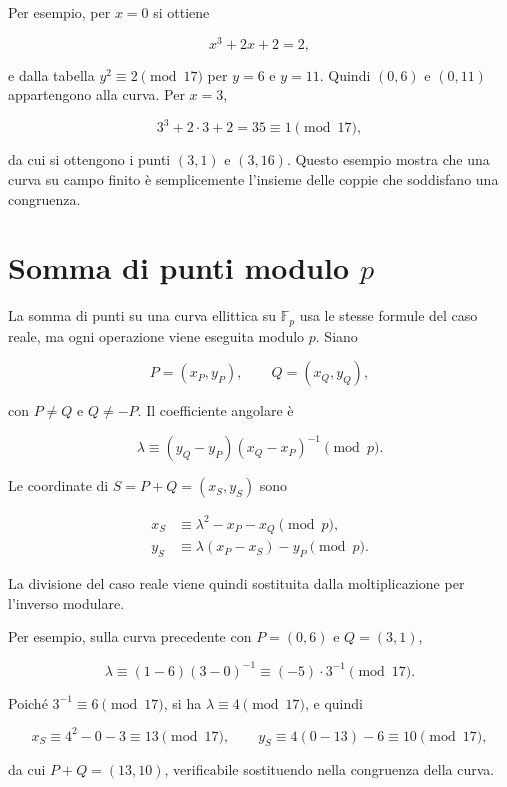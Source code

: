 \documentclass[12pt,a4paper,oneside]{report}
\begin{document}
Per esempio, per \(x=0\) si ottiene

\[
x^3+2x+2=2,
\]

e dalla tabella \(y^2\equiv 2\pmod{17}\) per \(y=6\) e \(y=11\). Quindi \((0,6)\) e \((0,11)\) appartengono alla curva. Per \(x=3\),

\[
3^3+2\cdot 3+2=35\equiv 1\pmod{17},
\]

da cui si ottengono i punti \((3,1)\) e \((3,16)\). Questo esempio mostra che una curva su campo finito è semplicemente l'insieme delle coppie che soddisfano una congruenza.

\section{Somma di punti modulo \texorpdfstring{\(p\)}{p}}

La somma di punti su una curva ellittica su \(\mathbb{F}_p\) usa le stesse formule del caso reale, ma ogni operazione viene eseguita modulo \(p\). Siano

\[
P=(x_P,y_P), \qquad Q=(x_Q,y_Q),
\]

con \(P\neq Q\) e \(Q\neq -P\). Il coefficiente angolare è

\begin{equation}
    \lambda \equiv (y_Q-y_P)(x_Q-x_P)^{-1}\pmod p.
    \label{eq:lambda-add-fp}
\end{equation}

Le coordinate di \(S=P+Q=(x_S,y_S)\) sono

\begin{align}
    x_S &\equiv \lambda^2-x_P-x_Q \pmod p, \label{eq:add-x-fp}\\
    y_S &\equiv \lambda(x_P-x_S)-y_P \pmod p. \label{eq:add-y-fp}
\end{align}

La divisione del caso reale viene quindi sostituita dalla moltiplicazione per l'inverso modulare.

Per esempio, sulla curva precedente con \(P=(0,6)\) e \(Q=(3,1)\),

\[
\lambda \equiv (1-6)(3-0)^{-1}\equiv (-5)\cdot 3^{-1}\pmod{17}.
\]

Poiché \(3^{-1}\equiv 6\pmod{17}\), si ha \(\lambda\equiv 4\pmod{17}\), e quindi

\[
x_S\equiv 4^2-0-3\equiv 13\pmod{17},\qquad
y_S\equiv 4(0-13)-6\equiv 10\pmod{17},
\]

da cui \(P+Q=(13,10)\), verificabile sostituendo nella congruenza della curva.
\end{document}
